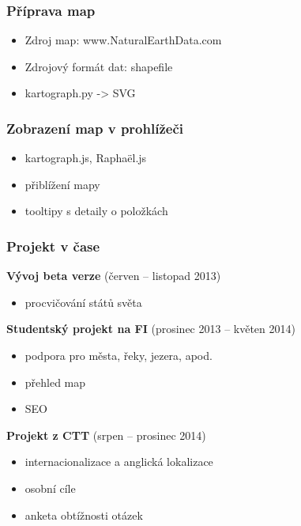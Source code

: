 \documentclass[xcolor=svgnames]{beamer}
\begin{document}
\begin{frame}
	\frametitle{Příprava map}
	\begin{itemize}
    \item Zdroj map: www.NaturalEarthData.com
    \item Zdrojový formát dat: shapefile
    \item kartograph.py -> SVG
	\end{itemize}
\end{frame}
\begin{frame}
	\frametitle{Zobrazení map v prohlížeči}
	\begin{itemize}
    \item kartograph.js, Raphaël.js
    \item přiblížení mapy
    \item tooltipy s detaily o položkách
    \
	\end{itemize}
\end{frame}
\begin{frame}
	\frametitle{Projekt v čase}
     \textbf{Vývoj beta verze} (červen -- listopad 2013)
    \begin{itemize}
      \item procvičování států světa
    \end{itemize}
     \textbf{Studentský projekt na FI} (prosinec 2013 -- květen 2014)
    \begin{itemize}
      \item podpora pro města, řeky, jezera, apod.
      \item přehled map
      \item SEO
    \end{itemize}
     \textbf{Projekt z CTT} (srpen -- prosinec 2014)
    \begin{itemize}
      \item internacionalizace a anglická lokalizace
      \item osobní cíle
      \item anketa obtížnosti otázek
    \end{itemize}
\end{frame}
\end{document}
